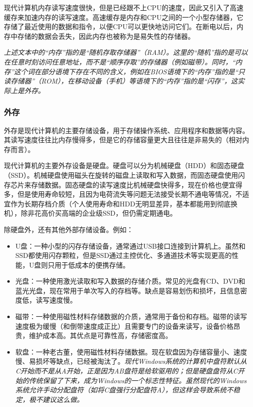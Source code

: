 \documentclass[../main.tex]{subfiles}
\begin{document}
现代计算机内存读写速度很快，但是已经跟不上CPU的速度，因此又引入了高速缓存来加速内存的读写速度。高速缓存是内存和CPU之间的一个小型存储器，它存储了最近使用的数据和指令，以便CPU可以更快地访问它们。在断电以后，内存中存储的数据会丢失，因此内存也被称为是易失性的存储器。

\emph{上述文本中的“内存”指的是“随机存取存储器”（RAM）。这里的“随机”指的是可以在任意时刻访问任意地址，而不是“顺序存取”的存储器（例如磁带）。同时，“内存”这个词在部分语境下存在不同的含义，例如在BIOS语境下的“内存”指的是“只读存储器”（ROM），在移动设备（手机）等语境下的“内存”指的是“闪存”，这实际上是外存。}

\subsubsection{外存}

外存是现代计算机的主要存储设备，用于存储操作系统、应用程序和数据等内容。其读写速度往往比内存慢得多，但是它的存储容量更大且往往是非易失的（相对内存而言）。

现代计算机的主要外存设备是硬盘。硬盘可以分为机械硬盘（HDD）和固态硬盘（SSD）。机械硬盘使用磁头在旋转的磁盘上读取和写入数据，而固态硬盘使用闪存芯片来存储数据。固态硬盘的读写速度比机械硬盘快得多，现在价格也便宜得多，但是使用寿命较短，且因为电荷流失等问题无法接受长期不通电等情况，不适宜作为长期存档介质（个人使用寿命和HDD无明显差异，基本都能用到彻底换机），除非花高价买高端的企业级SSD，但仍需定期通电。

除硬盘外，还有其他外部存储设备。例如：
\begin{itemize}
  \item U盘：一种小型的闪存存储设备，通常通过USB接口连接到计算机上。虽然和SSD都使用闪存颗粒，但是SSD通过主控优化、多通道技术等实现更高的性能，U盘则只用于低成本的便携存储。
  \item 光盘：一种使用激光读取和写入数据的存储介质。常见的光盘有CD、DVD和蓝光光盘，现在常用于单次写入的存档等。缺点是容易划伤和损坏，且信息密度低，读写速度慢。
  \item 磁带：一种使用磁性材料存储数据的介质，通常用于备份和存档。磁带的读写速度极为缓慢（和倒带速度成正比）且需要专门的设备来读写，设备价格昂贵，维护成本高。其优点是可靠性高，存储密度高。
  \item 软盘：一种老古董，使用磁性材料存储数据。现在软盘因为存储容量小、速度慢、易损坏等缺点，已经被淘汰了。\emph{现代Windows系统的计算机中盘符默认从C开始而不是从A开始，正是因为AB盘符是给软驱用的；但是硬盘盘符从C开始的传统保留了下来，成为Windows的一个标志性特征。虽然现代的Windows系统允许手动分配盘符（如将C盘强行分配盘符A），但这样会导致系统不稳定，极不建议这么做。}
\end{itemize}
\end{document}
